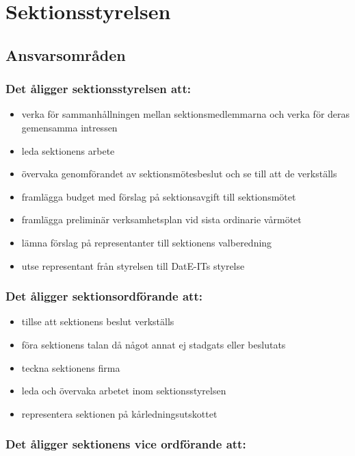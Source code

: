 \section{Sektionsstyrelsen}

\subsection{Ansvarsområden}

\subsubsection{Det åligger sektionsstyrelsen att:}

\begin{itemize}
  \item verka för sammanhållningen mellan sektionsmedlemmarna och verka för deras gemensamma intressen 
  \item leda sektionens arbete 
  \item övervaka genomförandet av sektionsmötesbeslut och se till att de verkställs 
  \item framlägga budget med förslag på sektionsavgift till sektionsmötet 
  \item framlägga preliminär verksamhetsplan vid sista ordinarie vårmötet 
  \item lämna förslag på representanter till sektionens valberedning 
  \item utse representant från styrelsen till DatE-ITs styrelse
\end{itemize}

\subsubsection{Det åligger sektionsordförande att:} 

\begin{itemize}
  \item tillse att sektionens beslut verkställs 
  \item föra sektionens talan då något annat ej stadgats eller beslutats 
  \item teckna sektionens firma 
  \item leda och övervaka arbetet inom sektionsstyrelsen 
  \item representera sektionen på kårledningsutskottet
\end{itemize}

\subsubsection{Det åligger sektionens vice ordförande att:}


